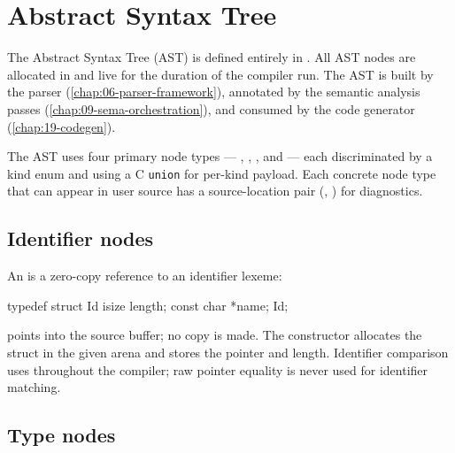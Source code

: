 \chapter{Abstract Syntax Tree}
\label{chap:04-ast}

\pnum
The Abstract Syntax Tree (AST) is defined entirely in .  All
AST nodes are allocated in  and live for the duration of the
compiler run.  The AST is built by the parser (\cref{chap:06-parser-framework}),
annotated by the semantic analysis passes (\cref{chap:09-sema-orchestration}), and
consumed by the code generator (\cref{chap:19-codegen}).

\pnum
The AST uses four primary node types — , , ,
and  — each discriminated by a kind enum and using a C \texttt{union}
for per-kind payload.  Each concrete node type that can appear in user source has
a source-location pair (, ) for diagnostics.

\section{Identifier nodes}
\label{sec:ast-identifiers}

\pnum
An  is a zero-copy reference to an identifier lexeme:

\begin{ccode}
typedef struct Id {
    isize       length;
    const char *name;
} Id;
\end{ccode}

\pnum
{} points into the source buffer; no copy is made.  The
constructor  allocates the 
struct in the given arena and stores the pointer and length.  Identifier
comparison uses  throughout the
compiler; raw pointer equality is never used for identifier matching.

\section{Type nodes}
\label{sec:ast-types}

